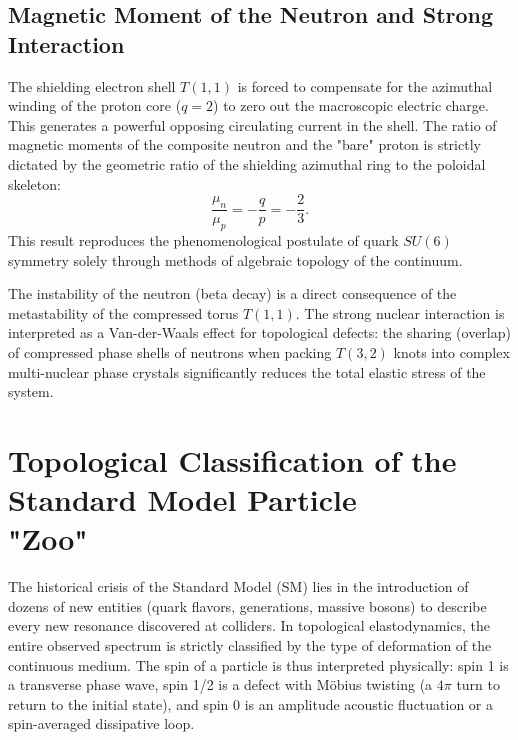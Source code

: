\documentclass[11pt,a4paper]{article}
\begin{document}
\subsection{Magnetic Moment of the Neutron and Strong Interaction}
	The shielding electron shell $T(1,1)$ is forced to compensate for the azimuthal winding of the proton core ($q=2$) to zero out the macroscopic electric charge. This generates a powerful opposing circulating current in the shell. The ratio of magnetic moments of the composite neutron and the "bare" proton is strictly dictated by the geometric ratio of the shielding azimuthal ring to the poloidal skeleton:
	\begin{equation}
		\frac{\mu_n}{\mu_p} = -\frac{q}{p} = -\frac{2}{3}.
	\end{equation}
	This result reproduces the phenomenological postulate of quark $SU(6)$ symmetry solely through methods of algebraic topology of the continuum.
	
	The instability of the neutron (beta decay) is a direct consequence of the metastability of the compressed torus $T(1,1)$. The strong nuclear interaction is interpreted as a Van-der-Waals effect for topological defects: the sharing (overlap) of compressed phase shells of neutrons when packing $T(3,2)$ knots into complex multi-nuclear phase crystals significantly reduces the total elastic stress of the system.
	
\section{Topological Classification of the Standard Model Particle \\ "Zoo"}
	
	The historical crisis of the Standard Model (SM) lies in the introduction of dozens of new entities (quark flavors, generations, massive bosons) to describe every new resonance discovered at colliders. In topological elastodynamics, the entire observed spectrum is strictly classified by the type of deformation of the continuous medium. The spin of a particle is thus interpreted physically: spin 1 is a transverse phase wave, spin 1/2 is a defect with Möbius twisting (a $4\pi$ turn to return to the initial state), and spin 0 is an amplitude acoustic fluctuation or a spin-averaged dissipative loop.
	
\end{document}
